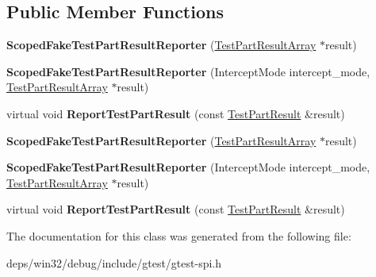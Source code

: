 \subsection*{Public Member Functions}
\begin{DoxyCompactItemize}
\item 
\hypertarget{classtesting_1_1_scoped_fake_test_part_result_reporter_aa0100ecf4799fb51d45167be6a5de1d5}{}{\bfseries Scoped\+Fake\+Test\+Part\+Result\+Reporter} (\hyperlink{classtesting_1_1_test_part_result_array}{Test\+Part\+Result\+Array} $\ast$result)\label{classtesting_1_1_scoped_fake_test_part_result_reporter_aa0100ecf4799fb51d45167be6a5de1d5}

\item 
\hypertarget{classtesting_1_1_scoped_fake_test_part_result_reporter_a57cbc09ed48627c8a73e622618dc4b4f}{}{\bfseries Scoped\+Fake\+Test\+Part\+Result\+Reporter} (Intercept\+Mode intercept\+\_\+mode, \hyperlink{classtesting_1_1_test_part_result_array}{Test\+Part\+Result\+Array} $\ast$result)\label{classtesting_1_1_scoped_fake_test_part_result_reporter_a57cbc09ed48627c8a73e622618dc4b4f}

\item 
\hypertarget{classtesting_1_1_scoped_fake_test_part_result_reporter_a3bc6cb939cbc3db71ece8846e6bafe00}{}virtual void {\bfseries Report\+Test\+Part\+Result} (const \hyperlink{classtesting_1_1_test_part_result}{Test\+Part\+Result} \&result)\label{classtesting_1_1_scoped_fake_test_part_result_reporter_a3bc6cb939cbc3db71ece8846e6bafe00}

\item 
\hypertarget{classtesting_1_1_scoped_fake_test_part_result_reporter_aa0100ecf4799fb51d45167be6a5de1d5}{}{\bfseries Scoped\+Fake\+Test\+Part\+Result\+Reporter} (\hyperlink{classtesting_1_1_test_part_result_array}{Test\+Part\+Result\+Array} $\ast$result)\label{classtesting_1_1_scoped_fake_test_part_result_reporter_aa0100ecf4799fb51d45167be6a5de1d5}

\item 
\hypertarget{classtesting_1_1_scoped_fake_test_part_result_reporter_a57cbc09ed48627c8a73e622618dc4b4f}{}{\bfseries Scoped\+Fake\+Test\+Part\+Result\+Reporter} (Intercept\+Mode intercept\+\_\+mode, \hyperlink{classtesting_1_1_test_part_result_array}{Test\+Part\+Result\+Array} $\ast$result)\label{classtesting_1_1_scoped_fake_test_part_result_reporter_a57cbc09ed48627c8a73e622618dc4b4f}

\item 
\hypertarget{classtesting_1_1_scoped_fake_test_part_result_reporter_a3bc6cb939cbc3db71ece8846e6bafe00}{}virtual void {\bfseries Report\+Test\+Part\+Result} (const \hyperlink{classtesting_1_1_test_part_result}{Test\+Part\+Result} \&result)\label{classtesting_1_1_scoped_fake_test_part_result_reporter_a3bc6cb939cbc3db71ece8846e6bafe00}

\end{DoxyCompactItemize}


The documentation for this class was generated from the following file\+:\begin{DoxyCompactItemize}
\item 
deps/win32/debug/include/gtest/gtest-\/spi.\+h\end{DoxyCompactItemize}
